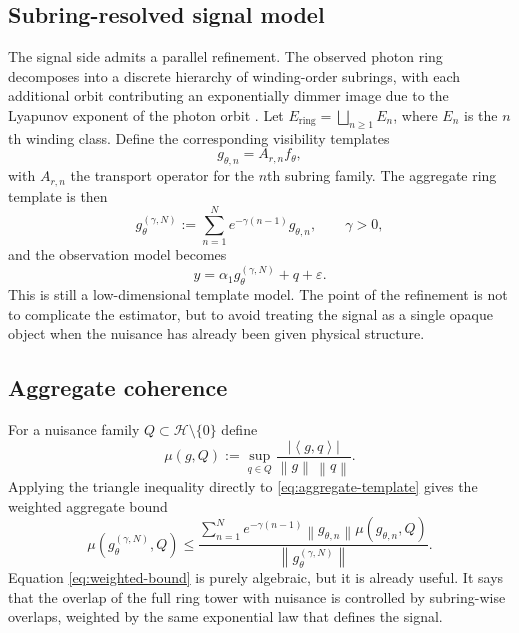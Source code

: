 \documentclass[11pt,a4paper]{article}
\theoremstyle{definition}
\theoremstyle{remark}
\newcommand{\inner}[2]{\left\langle #1, #2 \right\rangle}
\newcommand{\norm}[1]{\left\lVert #1 \right\rVert}
\newcommand{\abs}[1]{\left\lvert #1 \right\rvert}
\begin{document}
\subsection{Subring-resolved signal model}

The signal side admits a parallel refinement. The observed photon ring decomposes into a discrete hierarchy of winding-order subrings, with each additional orbit contributing an exponentially dimmer image due to the Lyapunov exponent of the photon orbit \citep{Gralla2020Lensing,Gralla2020Ring}. Let $E_{\mathrm{ring}}=\bigsqcup_{n\ge1} E_n$, where $E_n$ is the $n$th winding class. Define the corresponding visibility templates
\[
g_{\theta,n}=A_{r,n} f_\theta,
\]
with $A_{r,n}$ the transport operator for the $n$th subring family. The aggregate ring template is then
\begin{equation}
g_{\theta}^{(\gamma,N)}
:=
\sum_{n=1}^{N} e^{-\gamma (n-1)} g_{\theta,n},
\qquad \gamma>0,
\label{eq:aggregate-template}
\end{equation}
and the observation model becomes
\begin{equation}
y = \alpha_1 g_{\theta}^{(\gamma,N)} + q + \varepsilon.
\label{eq:aggregate-model}
\end{equation}
This is still a low-dimensional template model. The point of the refinement is not to complicate the estimator, but to avoid treating the signal as a single opaque object when the nuisance has already been given physical structure.

\subsection{Aggregate coherence}

For a nuisance family $Q \subset \mathcal H \setminus \{0\}$ define
\begin{equation}
\mu(g,Q)
:=
\sup_{q\in Q}
\frac{\abs{\inner{g}{q}}}{\norm{g}\,\norm{q}}.
\label{eq:family-coherence}
\end{equation}
Applying the triangle inequality directly to \eqref{eq:aggregate-template} gives the weighted aggregate bound
\begin{equation}
\mu\!\left(g_{\theta}^{(\gamma,N)},Q\right)
\le
\frac{\sum_{n=1}^{N} e^{-\gamma(n-1)} \norm{g_{\theta,n}} \mu(g_{\theta,n},Q)}
{\norm{g_{\theta}^{(\gamma,N)}}}.
\label{eq:weighted-bound}
\end{equation}
Equation \eqref{eq:weighted-bound} is purely algebraic, but it is already useful. It says that the overlap of the full ring tower with nuisance is controlled by subring-wise overlaps, weighted by the same exponential law that defines the signal.
\end{document}
